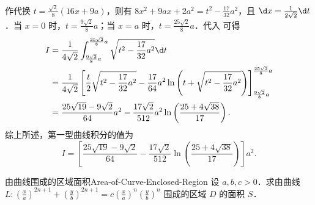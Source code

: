 \begin{solution}
    作代换 $t = \frac{\sqrt{2}}{8} (16x + 9a)$，则有 $8x^2 + 9ax + 2a^2 = t^2 - \frac{17}{32} a^2$，且 $\d x = \frac{1}{2\sqrt{2}} \d t$．当 $x = 0$ 时，$t = \frac{9\sqrt{2}}{8} a$；当 $x = a$ 时，$t = \frac{25\sqrt{2}}{8} a$．代入  可得
    \begin{equation}
        \begin{aligned}
            I & = \frac{1}{4\sqrt{2}} \int_{\frac{9\sqrt{2}}{8} a}^{\frac{25\sqrt{2}}{8} a} \sqrt{t^2 - \frac{17}{32} a^2} \d t                                                                                           \\
              & = \frac{1}{4\sqrt{2}} \left[ \frac{t}{2}\sqrt{t^2 - \frac{17}{32} a^2} - \frac{17}{64} a^2 \ln \left( t + \sqrt{t^2 - \frac{17}{32} a^2} \right) \right]_{\frac{9\sqrt{2}}{8} a}^{\frac{25\sqrt{2}}{8} a} \\
              & = \frac{25\sqrt{19} - 9\sqrt{2}}{64} a^2 - \frac{17\sqrt{2}}{512} a^2 \ln \left( \frac{25 + 4\sqrt{38}}{17} \right).
        \end{aligned}
    \end{equation}
    综上所述，第一型曲线积分的值为
    \begin{equation}
        I = \boxed{ \left[ \frac{25\sqrt{19} - 9\sqrt{2}}{64} - \frac{17\sqrt{2}}{512} \ln \left( \frac{25 + 4\sqrt{38}}{17} \right) \right] a^2 }.
    \end{equation}
\end{solution}

\begin{problem}{由曲线围成的区域面积}{Area-of-Curve-Enclosed-Region}
    设 $a, b, c > 0$．求由曲线 $L : \left(\frac{x}{a}\right)^{2n+1} + \left(\frac{y}{b}\right)^{2n+1} = c\left(\frac{x}{a}\right)^n\left(\frac{y}{b}\right)^n$ 围成的区域 $D$ 的面积 $S$．
\end{problem}

